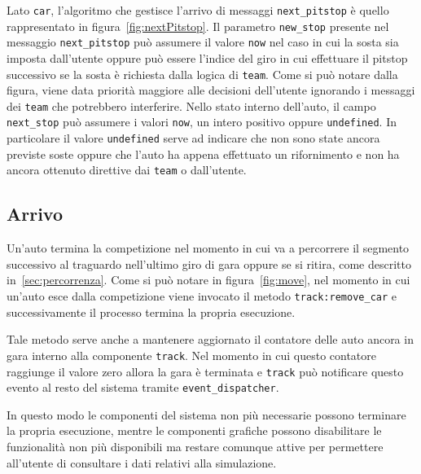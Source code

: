 \documentclass[a4paper]{report}
\newcommand{\fun}[1]{\texttt{#1}}
\begin{document}
Lato \texttt{car}, l'algoritmo che gestisce l'arrivo di messaggi \fun{next\_pitstop} è quello rappresentato in figura~\ref{fig:nextPitstop}. Il parametro \fun{new\_stop} presente nel messaggio \fun{next\_pitstop} può assumere il valore \fun{now} nel caso in cui la sosta sia imposta dall'utente oppure può essere l'indice del giro in cui effettuare il pitstop successivo se la sosta è richiesta dalla logica di \texttt{team}. Come si può notare dalla figura, viene data priorità maggiore alle decisioni dell'utente ignorando i messaggi dei \texttt{team} che potrebbero interferire. Nello stato interno dell'auto, il campo \fun{next\_stop} può assumere i valori \fun{now}, un intero positivo oppure \fun{undefined}. In particolare il valore \fun{undefined} serve ad indicare che non sono state ancora previste soste oppure che l'auto ha appena effettuato un rifornimento e non ha ancora ottenuto direttive dai \texttt{team} o dall'utente.

\subsection{Arrivo}
Un'auto termina la competizione nel momento in cui va a percorrere il segmento successivo al traguardo nell'ultimo giro di gara oppure se si ritira, come descritto in~\ref{sec:percorrenza}. Come si può notare in figura~\ref{fig:move}, nel momento in cui un'auto esce dalla competizione viene invocato il metodo \fun{track:remove\_car} e successivamente il processo termina la propria esecuzione.

Tale metodo serve anche a mantenere aggiornato il contatore delle auto ancora in gara interno alla componente \texttt{track}. Nel momento in cui questo contatore raggiunge il valore zero allora la gara è terminata e \texttt{track} può notificare questo evento al resto del sistema tramite \texttt{event\_dispatcher}.

In questo modo le componenti del sistema non più necessarie possono terminare la propria esecuzione, mentre le componenti grafiche possono disabilitare le funzionalità non più disponibili ma restare comunque attive per permettere all'utente di consultare i dati relativi alla simulazione.
\end{document}
